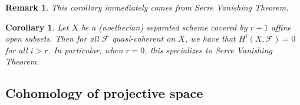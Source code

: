 \documentclass{ctexart}
\newtheorem{remark}{Remark}[section]
\newtheorem{corollary}{Corollary}[section]
\begin{document}
\begin{remark}
    This corollary immediately comes from Serre Vanishing Theorem.
\end{remark}
\begin{corollary}
    Let $X$ be a (noetherian) separated scheme covered by $r + 1$ affine open subsets.
    Then for all $\mathcal{F}$ quasi-coherent on $X$, we have that $H^{i}(X, \mathcal{F}) = 0$ for all $i > r$.
    In particular, when $r = 0$, this specializes to Serre Vanishing Theorem.
    \label{Corollary 7.7}
\end{corollary}

\subsection{Cohomology of projective space}
\label{subsection:Sheaf_Cohomology_Cohomology_of_projective_space}
\end{document}
